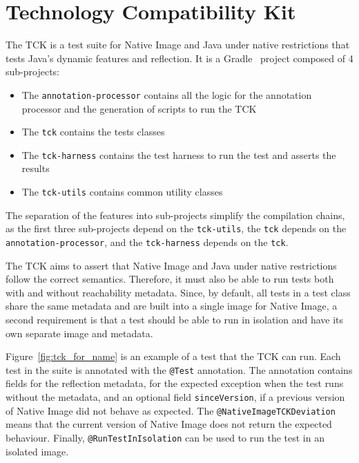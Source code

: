\section{Technology Compatibility Kit}\label{TCK}
The TCK is a test suite for Native Image and Java under native restrictions that tests Java's dynamic features and reflection. 
It is a Gradle~\cite{noauthor_gradle_2024} project composed of 4 sub-projects: 
\begin{itemize}
    \item The \verb|annotation-processor| contains all the logic for the annotation processor and the generation of scripts to run the TCK
    \item The \verb|tck| contains the tests classes
    \item The \verb|tck-harness| contains the test harness to run the test and asserts the results
    \item The \verb|tck-utils| contains common utility classes
\end{itemize}
The separation of the features into sub-projects simplify the compilation chains, as the first three sub-projects depend on the \verb|tck-utils|, the \verb|tck| depends on the \verb|annotation-processor|, and the \verb|tck-harness| depends on the \verb|tck|.

The TCK aims to assert that Native Image and Java under native restrictions follow the correct semantics. Therefore, it must also be able to run tests both with and without reachability metadata. Since, by default, all tests in a test class share the same metadata and are built into a single image for Native Image, a second requirement is that a test should be able to run in isolation and have its own separate image and metadata. 

Figure~\ref{fig:tck_for_name} is an example of a test that the TCK can run. Each test in the suite is annotated with the \verb|@Test| annotation. The annotation contains fields for the reflection metadata, for the expected exception when the test runs without the metadata, and an optional field \verb|sinceVersion|, if a previous version of Native Image did not behave as expected. The \verb|@NativeImageTCKDeviation| means that the current version of Native Image does not return the expected behaviour. Finally, \verb|@RunTestInIsolation| can be used to run the test in an isolated image. 

